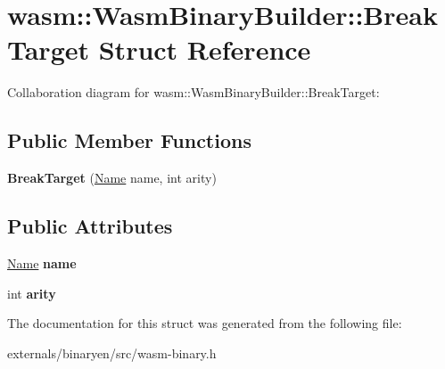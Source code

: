\hypertarget{structwasm_1_1_wasm_binary_builder_1_1_break_target}{}\section{wasm\+:\+:Wasm\+Binary\+Builder\+:\+:Break\+Target Struct Reference}
\label{structwasm_1_1_wasm_binary_builder_1_1_break_target}


Collaboration diagram for wasm\+:\+:Wasm\+Binary\+Builder\+:\+:Break\+Target\+:
\subsection*{Public Member Functions}
\begin{DoxyCompactItemize}
\item 
\mbox{\label{structwasm_1_1_wasm_binary_builder_1_1_break_target_af46c906c4715e10ece38762bca89571e}} 
{\bfseries Break\+Target} (\mbox{\hyperlink{structwasm_1_1_name}{Name}} name, int arity)
\end{DoxyCompactItemize}
\subsection*{Public Attributes}
\begin{DoxyCompactItemize}
\item 
\mbox{\label{structwasm_1_1_wasm_binary_builder_1_1_break_target_ad05bdbc530bd63da0e5a7d877a3d22a7}} 
\mbox{\hyperlink{structwasm_1_1_name}{Name}} {\bfseries name}
\item 
\mbox{\label{structwasm_1_1_wasm_binary_builder_1_1_break_target_a03e20a675db7d132731bf27a352b4aba}} 
int {\bfseries arity}
\end{DoxyCompactItemize}


The documentation for this struct was generated from the following file\+:\begin{DoxyCompactItemize}
\item 
externals/binaryen/src/wasm-\/binary.\+h\end{DoxyCompactItemize}
